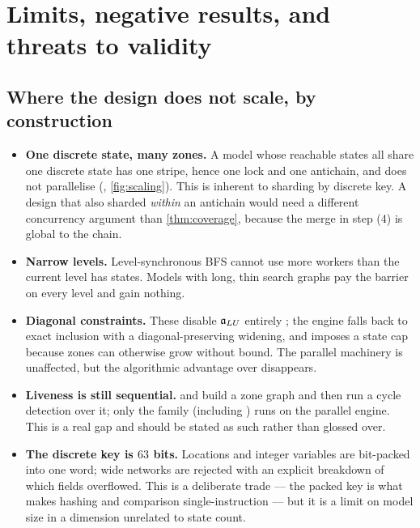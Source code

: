 \section{Limits, negative results, and threats to validity}
\label{sec:limits}

\subsection{Where the design does not scale, by construction}

\begin{itemize}[leftmargin=1.2em, itemsep=3pt]
\item \textbf{One discrete state, many zones.}  A model whose reachable states
      all share one discrete state has one stripe, hence one lock and one
      antichain, and does not parallelise (, \cref{fig:scaling}).
      This is inherent to sharding by discrete key.  A design that also sharded
      \emph{within} an antichain would need a different concurrency argument
      than \cref{thm:coverage}, because the merge in step (4) is global to the
      chain.

\item \textbf{Narrow levels.}  Level-synchronous BFS cannot use more workers
      than the current level has states.  Models with long, thin search graphs
      pay the barrier on every level and gain nothing.

\item \textbf{Diagonal constraints.}  These disable $\mathfrak{a}_{LU}$ entirely
      \cite{Bouyer04}; the engine falls back to exact inclusion with a
      diagonal-preserving widening, and imposes a state cap because zones can
      otherwise grow without bound.  The parallel machinery is unaffected, but
      the algorithmic advantage over \uppaal{} disappears.

\item \textbf{Liveness is still sequential.}   and 
      build a zone graph and then run a cycle detection over it; only the
       family (including ) runs on the parallel
      engine.  This is a real gap and should be stated as such rather than
      glossed over.

\item \textbf{The discrete key is $63$ bits.}  Locations and integer variables
      are bit-packed into one word; wide networks are rejected with an explicit
      breakdown of which fields overflowed.  This is a deliberate trade --- the
      packed key is what makes hashing and comparison single-instruction --- but
      it is a limit on model size in a dimension unrelated to state count.
\end{itemize}

